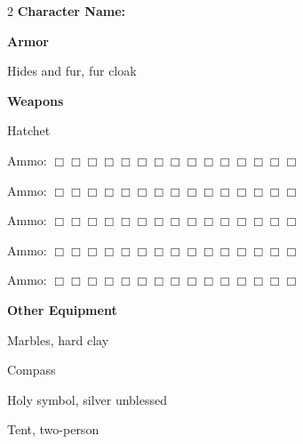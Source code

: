 \documentclass[10pt]{article}
\begin{document}
\begin{multicols}{2}
\textbf{Character Name:} \hrulefill

\vspace{24pt}

\textbf{Armor}


Hides and fur, fur cloak




\hrulefill


\hrulefill


\hrulefill



\vspace{24pt}

\textbf{Weapons}


Hatchet




\hrulefill

Ammo: $\Box \Box \Box \Box \Box \Box \Box \Box \Box \Box \Box \Box \Box \Box \Box$ 


\hrulefill

Ammo: $\Box \Box \Box \Box \Box \Box \Box \Box \Box \Box \Box \Box \Box \Box \Box$ 


\hrulefill

Ammo: $\Box \Box \Box \Box \Box \Box \Box \Box \Box \Box \Box \Box \Box \Box \Box$ 


\hrulefill

Ammo: $\Box \Box \Box \Box \Box \Box \Box \Box \Box \Box \Box \Box \Box \Box \Box$ 


\hrulefill

Ammo: $\Box \Box \Box \Box \Box \Box \Box \Box \Box \Box \Box \Box \Box \Box \Box$ 



\vspace{24pt}

\textbf{Other Equipment}


Marbles, hard clay


Compass


Holy symbol, silver unblessed


Tent, two-person




\hrulefill


\hrulefill


\hrulefill


\hrulefill


\hrulefill


\hrulefill


\hrulefill


\hrulefill



\end{multicols}
\end{document}
